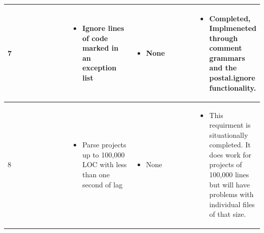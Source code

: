 \documentclass[letterpaper,10pt,titlepage,draftclsnofoot,onecolumn,onesided] {IEEEtran}
\begin{document}
{\begin{center}
\begin{singlespace}
\begin{tabular}{ |  p{0.25\linewidth}  |  p{0.25\linewidth}  | p{0.25\linewidth} | p{0.25\linewidth} |}
        	7
		& 
			\begin{itemize}
				\item Ignore lines of code marked in an exception list
			\end{itemize}
		& 
			\begin{itemize}
				\item None
			\end{itemize}
		&
			\begin{itemize}
				\item Completed, Implmeneted through comment grammars and the postal.ignore functionality.
			\end{itemize} 
		
        \\ \hline

        	8
		& 
			\begin{itemize}
				\item Parse projects up to 100,000 LOC with less than one second of lag
			\end{itemize}
		& 
			\begin{itemize}
				\item None
			\end{itemize}
		&
			\begin{itemize}
				\item This requirment is situationally completed. 
                It does work for projects of 100,000 lines but will have problems with individual files of that size.
			\end{itemize} 
		
        \\ \hline
		\end{tabular}
	\end{singlespace}
\end{center}
}
\end{document}
